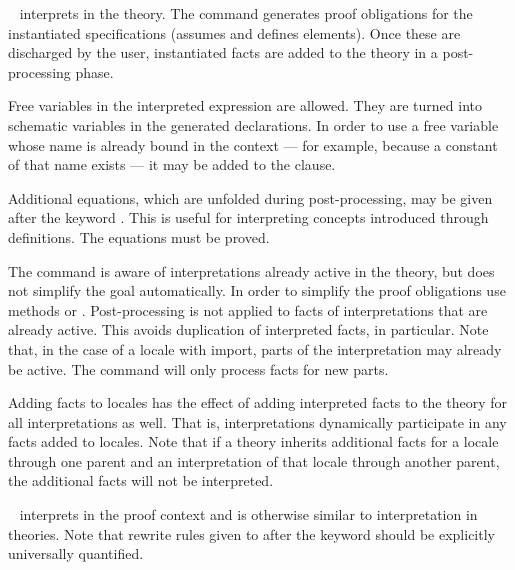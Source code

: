 \begin{isabellebody}
\begin{isamarkuptext}
  \begin{description}

  \item \hyperlink{command.interpretation}{\mbox{}}~
  interprets  in the theory.  The command generates proof
  obligations for the instantiated specifications (assumes and defines
  elements).  Once these are discharged by the user, instantiated
  facts are added to the theory in a post-processing phase.

  Free variables in the interpreted expression are allowed.  They are
  turned into schematic variables in the generated declarations.  In
  order to use a free variable whose name is already bound in the
  context --- for example, because a constant of that name exists ---
  it may be added to the \hyperlink{keyword.for}{\mbox{}} clause.

  Additional equations, which are unfolded during
  post-processing, may be given after the keyword \hyperlink{keyword.where}{\mbox{}}.
  This is useful for interpreting concepts introduced through
  definitions.  The equations must be proved.

  The command is aware of interpretations already active in the
  theory, but does not simplify the goal automatically.  In order to
  simplify the proof obligations use methods \hyperlink{method.intro-locales}{\mbox{}}
  or \hyperlink{method.unfold-locales}{\mbox{}}.  Post-processing is not applied to
  facts of interpretations that are already active.  This avoids
  duplication of interpreted facts, in particular.  Note that, in the
  case of a locale with import, parts of the interpretation may
  already be active.  The command will only process facts for new
  parts.

  Adding facts to locales has the effect of adding interpreted facts
  to the theory for all interpretations as well.  That is,
  interpretations dynamically participate in any facts added to
  locales.  Note that if a theory inherits additional facts for a
  locale through one parent and an interpretation of that locale
  through another parent, the additional facts will not be
  interpreted.

  \item \hyperlink{command.interpret}{\mbox{}}~ interprets
   in the proof context and is otherwise similar to
  interpretation in theories.  Note that rewrite rules given to
  \hyperlink{command.interpret}{\mbox{}} after the \hyperlink{keyword.where}{\mbox{}} keyword should be
  explicitly universally quantified.


\end{description}
\end{isamarkuptext}
\end{isabellebody}
